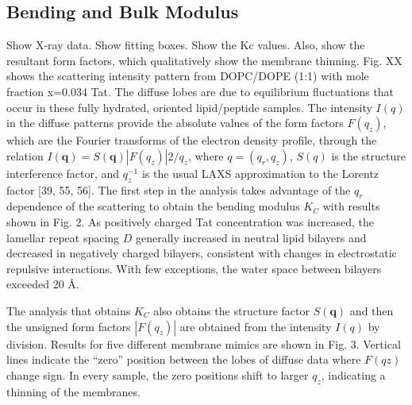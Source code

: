 \subsection{Bending and Bulk Modulus}\label{sec:Kc_results}
Show X-ray data. Show fitting boxes.
Show the Kc values.
Also, show the resultant
form factors, which qualitatively show the membrane thinning.
Fig. XX shows the scattering intensity pattern from DOPC/DOPE (1:1) with mole 
fraction
x=0.034 Tat. The diffuse lobes are due to equilibrium fluctuations that occur 
in these fully
hydrated, oriented lipid/peptide samples. The intensity $I(q)$ in the diffuse 
patterns provide the
absolute values of the form factors $F(q_z)$, which are the Fourier transforms 
of the electron density
profile, through the relation $I(\mathbf{q})=S(\mathbf{q})|F(q_z)|2/q_z$, 
where $q=(q_r,q_z)$, $S(q)$ is 
the structure
interference factor, and $q_z^{−1}$ is the usual LAXS approximation to the 
Lorentz factor [39, 55, 56].
The first step in the analysis takes advantage of the $q_r$ dependence of the 
scattering to obtain the
bending modulus $K_C$ with results shown in Fig. 2. As positively charged Tat 
concentration was
increased, the lamellar repeat spacing $D$ generally increased in neutral lipid 
bilayers and
decreased in negatively charged bilayers, consistent with changes in 
electrostatic repulsive
interactions. With few exceptions, the water space between bilayers exceeded 
20 \AA.

The analysis that obtains $K_C$ also obtains the structure factor $S(\mathbf{q})$ 
and then the unsigned
form factors $|F(q_z)|$ are obtained from the intensity $I(q)$ by division. 
Results for five different
membrane mimics are shown in Fig. 3. Vertical lines indicate the “zero” position 
between the
lobes of diffuse data where $F(qz)$ change sign. In every sample, the zero 
positions shift to larger
$q_z$, indicating a thinning of the membranes.

